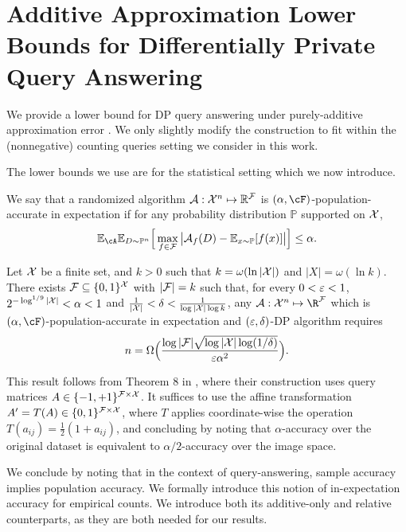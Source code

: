 \section{Additive Approximation Lower Bounds for Differentially Private Query Answering}

\label{app:LB_proofs}

We provide a lower bound for DP query answering under purely-additive approximation error \citep{Lyu:2024}. We only slightly modify the construction to fit within the (nonnegative) counting queries setting we consider in this work.

The lower bounds we use are for the statistical setting which we now introduce. 
\begin{definition}
\label{def:expected_population_accuracy}
We say that a randomized algorithm ${\cal A}:{\cal X}^n\mapsto \mathbb{R}^{\cal F}$ is $(\alpha,\cF)$-population-accurate in expectation if  for any probability distribution $\mathbb{P}$ supported on ${\cal X}$,
\[ \mathbb{E}_{\cA}\mathbb{E}_{D\sim \mathbb{P}^n} \Big[\max_{f\in {\cal F}}\big|{\cal A}_f(D)-\mathbb{E}_{x\sim\mathbb{P}}[f(x)]\big|\Big] \leq \alpha. \]
\end{definition}

\begin{theorem}
\label{thm:LB_additive_query}
Let ${\cal X}$ be a finite set, and $k>0$ such that $k = \omega(\ln|{\cal X}|)$ and $|X|=\omega(\ln k)$. 
There exists ${\cal F}\subseteq\{0,1\}^{\cal X}$ with $|{\cal F}|=k$ such that, for every $0<\varepsilon<1$, $2^{-\log^{1/9}|{\cal X}|}<\alpha<1$ and $\frac{1}{|{\cal X}|} < \delta<\frac{1}{\log|{\cal X}| \log k}$, any ${\cal A}:{\cal X}^n\mapsto \R^{\cal F}$ which is $(\alpha,\cF)$-population-accurate in expectation and $(\varepsilon,\delta)$-DP algorithm requires
\[ n=\Omega\Big( \frac{\log|{\cal F}|\sqrt{\log|{\cal X}|\log(1/\delta)}}{\varepsilon\alpha^2} \Big). \]
\end{theorem}

This result follows from Theorem 8 in \cite{Lyu:2024}, where their construction uses query matrices $A\in \{-1,+1\}^{{\cal F}\times{\cal X}}$. It suffices to use the affine transformation
$A'=T(A)\in\{0,1\}^{{\cal F}\times{\cal X}}$, where $T$ applies coordinate-wise the operation $T(a_{ij})=\frac12(1+a_{ij})$, and  concluding by noting that $\alpha$-accuracy over the original dataset is equivalent to $\alpha/2$-accuracy over the image space.

We conclude by noting that in the context of query-answering, sample accuracy implies population accuracy. We formally introduce this notion of in-expectation accuracy for empirical counts. We introduce both its additive-only and relative counterparts, as they are both needed for our results.

